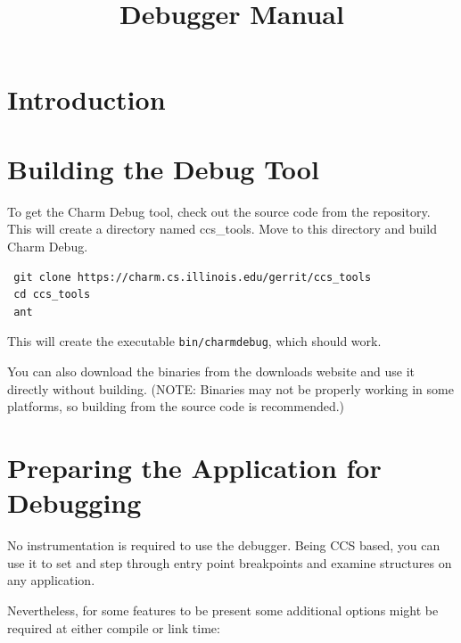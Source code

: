 \documentclass[10pt]{article}
\title{\charmpp\\ Debugger Manual}
\begin{document}
\maketitle

\section{Introduction}
\label{sec:intro}



\section{Building the \charmpp{} Debug Tool}

To get the Charm Debug tool, check out the source code from the repository.
This will create a directory named ccs\_tools. Move to this directory and 
build Charm Debug.

\begin{verbatim}
 git clone https://charm.cs.illinois.edu/gerrit/ccs_tools
 cd ccs_tools
 ant
\end{verbatim}

This will create the executable {\tt bin/charmdebug}, which should work.

You can also download the binaries from the \charmpp{} downloads website and use it
directly without building.
(NOTE: Binaries may not be properly working in some platforms, so building from the
source code is recommended.)


\section{Preparing the \charmpp Application for Debugging}

No instrumentation is required to use the \charmpp{} debugger.  Being
CCS based, you can use it to set and step through entry point
breakpoints and examine \charmpp{} structures on any \charmpp{}
application.

Nevertheless, for some features to be present some additional options might
be required at either compile or link time:
\end{document}
